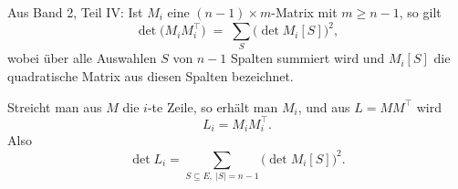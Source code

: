 \begin{merksatz}
Aus Band 2, Teil IV: Ist $M_i$ eine $(n-1) \times m$-Matrix mit $m \ge n-1$, so gilt
\[ \det\bigl(M_i M_i^{\!\top}\bigr) \;=\; \sum_{S} \bigl(\det M_i[S]\bigr)^2 , \]
wobei über alle Auswahlen $S$ von $n-1$ Spalten summiert wird und $M_i[S]$ die quadratische Matrix aus diesen Spalten bezeichnet.

Streicht man aus $M$ die $i$-te Zeile, so erhält man $M_i$, und aus $L = MM^{\!\top}$ wird
\[ L_i = M_i M_i^{\!\top} . \]
Also
\[ \det L_i = \sum_{S \subseteq E,\ |S| = n-1} \bigl(\det M_i[S]\bigr)^2 . \]

\begin{center}
\begin{minipage}{0.88\textwidth}
\end{minipage}
\end{center}
\end{merksatz}

